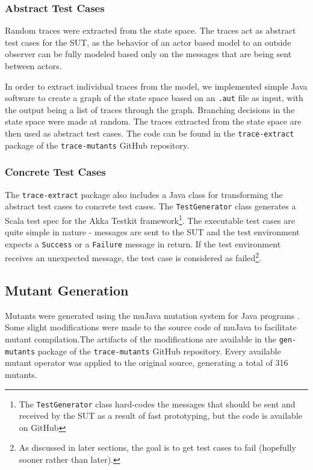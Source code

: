 \documentclass{article}
\begin{document}
			\subsubsection{Abstract Test Cases}
				\label{sec:method_abstract}
				Random traces were extracted from the state space. The traces act as abstract test cases for the SUT, as the behavior of an actor based model to an outside observer can be fully modeled based only on the messages that are being sent between actors.

				In order to extract individual traces from the \Rebeca model, we implemented simple Java software to create a graph of the state space based on an \texttt{.aut} file as input, with the output being a list of traces through the graph. Branching decisions in the state space were made at random. The traces extracted from the state space are then used as abstract test cases.
				The code can be found in the \texttt{trace-extract} package of the \texttt{trace-mutants} GitHub repository. \nocite{trace-mutants}

			\subsubsection{Concrete Test Cases}
				\label{sec:method_concrete}
				The \texttt{trace-extract} package also includes a Java class for transforming the abstract test cases to concrete test cases. The \texttt{TestGenerator} class generates a Scala test spec for the Akka Testkit framework\footnote{The \texttt{TestGenerator} class hard-codes the messages that should be sent and received by the SUT as a result of fast prototyping, but the code is available on GitHub}. The executable test cases are quite simple in nature \-- messages are sent to the SUT and the test environment expects a \texttt{Success} or a \texttt{Failure} message in return. If the test environment receives an unexpected message, the test case is considered as failed\footnote{As discussed in later sections, the goal is to get test cases to fail (hopefully sooner rather than later).}.

		\subsection{Mutant Generation}
			\label{sec:method_mutgen}
			Mutants were generated using the muJava mutation system for Java programs \citep{mujava}. Some slight modifications were made to the source code of muJava to facilitate mutant compilation.The artifacts of the modifications are available in the \texttt{gen-mutants} package of the \texttt{trace-mutants} GitHub repository. Every available mutant operator was applied to the original source, generating a total of 316 mutants.
\end{document}
